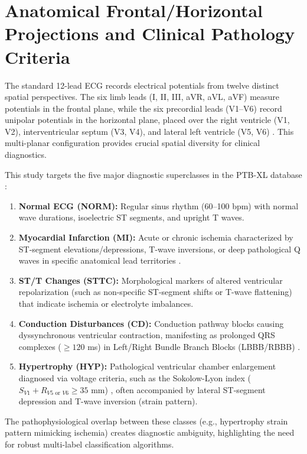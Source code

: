\documentclass[14pt]{extarticle}
\begin{document}
\section{Anatomical Frontal/Horizontal Projections and Clinical Pathology Criteria}
\label{sec:clinical}
The standard 12-lead ECG records electrical potentials from twelve distinct spatial perspectives. The six limb leads (I, II, III, aVR, aVL, aVF) measure potentials in the frontal plane, while the six precordial leads (V1--V6) record unipolar potentials in the horizontal plane, placed over the right ventricle (V1, V2), interventricular septum (V3, V4), and lateral left ventricle (V5, V6) \cite{schlapfer2017ecg}. This multi-planar configuration provides crucial spatial diversity for clinical diagnostics.

This study targets the five major diagnostic superclasses in the PTB-XL database \cite{wagner2020ptbxl}:
\begin{enumerate}
    \item \textbf{Normal ECG (NORM):} Regular sinus rhythm (60--100 bpm) with normal wave durations, isoelectric ST segments, and upright T waves.
    \item \textbf{Myocardial Infarction (MI):} Acute or chronic ischemia characterized by ST-segment elevations/depressions, T-wave inversions, or deep pathological Q waves in specific anatomical lead territories \cite{schlapfer2017ecg}.
    \item \textbf{ST/T Changes (STTC):} Morphological markers of altered ventricular repolarization (such as non-specific ST-segment shifts or T-wave flattening) that indicate ischemia or electrolyte imbalances.
    \item \textbf{Conduction Disturbances (CD):} Conduction pathway blocks causing dyssynchronous ventricular contraction, manifesting as prolonged QRS complexes ($\geq 120$ ms) in Left/Right Bundle Branch Blocks (LBBB/RBBB) \cite{hannun2019cardiologist}.
    \item \textbf{Hypertrophy (HYP):} Pathological ventricular chamber enlargement diagnosed via voltage criteria, such as the Sokolow-Lyon index ($S_{V1} + R_{V5 \text{ or } V6} \geq 35$ mm) \cite{strodthoff2021deep}, often accompanied by lateral ST-segment depression and T-wave inversion (strain pattern).
\end{enumerate}
The pathophysiological overlap between these classes (e.g., hypertrophy strain pattern mimicking ischemia) creates diagnostic ambiguity, highlighting the need for robust multi-label classification algorithms.
\end{document}
